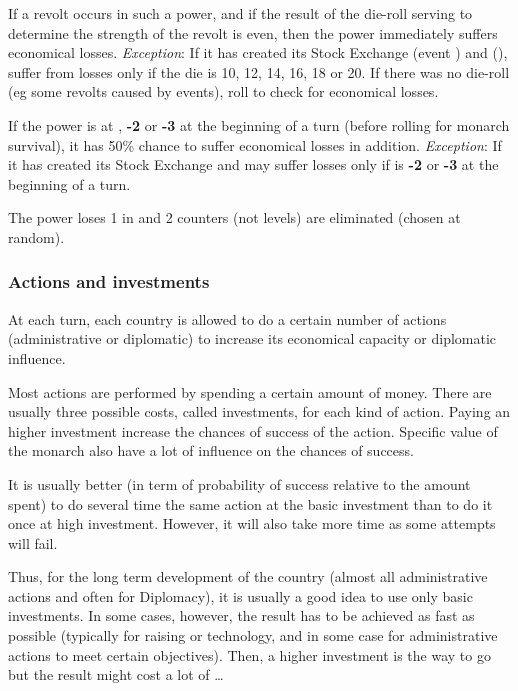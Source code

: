 \aparag If a revolt occurs in such a power, and if the result of the die-roll
serving to determine the strength of the revolt is even, then the power
immediately suffers economical losses.
\bparag \textit{Exception}: If it has created its Stock Exchange \HOL
(event ) and \ENG
(), suffer from losses only if the die
is %
10, 12, 14, 16, 18 or 20.
\bparag If there was no die-roll (eg some revolts caused by events), roll to
check for economical losses.

\aparag If the power is at , {\bf -2} or {\bf -3} at the
beginning of a turn (before rolling for monarch survival), it has 50\% chance
to suffer economical losses in addition.
\bparag \textit{Exception}: If it has created its Stock Exchange \HOL and \ENG
may suffer losses only if \STAB is {\bf -2} or {\bf -3} at the beginning of a
turn.

The power loses 1 in \STAB and 2 \MNU counters (not levels) are eliminated
(chosen at random).


\subsubsection{Actions and investments}
\aparag At each turn, each country is allowed to do a certain number of
actions (administrative or diplomatic) to increase its economical capacity or
diplomatic influence.

\aparag Most actions are performed by spending a certain amount of
money. There are usually three possible costs, called investments, for each
kind of action.
\bparag Paying an higher investment increase the chances of success of the
action.
\bparag Specific value of the monarch also have a lot of influence on the
chances of success.

\begin{playtip}
  It is usually better (in term of probability of success relative to the
  amount spent) to do several time the same action at the basic investment
  than to do it once at high investment. However, it will also take more time
  as some attempts will fail.

  Thus, for the long term development of the country (almost all
  administrative actions and often for Diplomacy), it is usually a good idea
  to use only basic investments. In some cases, however, the result has to be
  achieved as fast as possible (typically for raising \STAB or technology, and
  in some case for administrative actions to meet certain objectives). Then, a
  higher investment is the way to go but the result might cost a lot of
  \ducats\ldots
\end{playtip}

